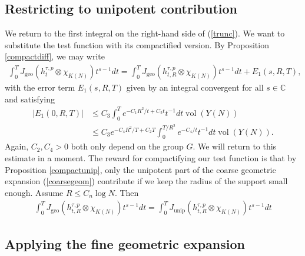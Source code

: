 \documentclass[11pt,reqno]{amsart}
\numberwithin{equation}{section}
\theoremstyle{definition}
\theoremstyle{remark}
\newcommand{\vol}{\operatorname{vol}}
\newcommand{\unip}{\operatorname{unip}}
\newcommand{\geo}{\operatorname{geo}}
\newcommand{\C}{\mathbb{C}}
\begin{document}
\medskip

\subsection*{Restricting to unipotent contribution}

\noindent We return to the first integral on the right-hand side of (\ref{trunc}). We want to substitute the test function with its compactified version. By Proposition \ref{compactdiff}, we may write
\begin{align*}
    \int_0^T J_{\geo}(h^{\tau,p}_t\otimes\chi_{K(N)})t^{s-1}dt = \int_0^T J_{\geo}(h^{\tau,p}_{t,R}\otimes\chi_{K(N)})t^{s-1}dt+E_1(s,R,T),
\end{align*}
with the error term $E_1(s,R,T)$ given by an integral convergent for all $s\in\C$ and satisfying
\begin{align}\label{error1}
    |E_1(0,R,T)| &\leq C_3\int_0^Te^{-C_1R^2/t+C_2t}t^{-1}dt\vol(Y(N)) \\
    &\leq C_3e^{-C_4R^2/T+C_2T}\int_0^{T/R^2}e^{-C_4/t}t^{-1}dt\vol(Y(N)).
\end{align}
Again, $C_2,C_4>0$ both only depend on the group $G$. We will return to this estimate in a moment. The reward for compactifying our test function is that by Proposition \ref{compactunip}, only the unipotent part of the coarse geometric expansion (\ref{coarsegeom}) contribute if we keep the radius of the support small enough. Assume $R\leq C_n\log N$. Then
\begin{align*}
    \int_0^T J_{\geo}(h^{\tau,p}_{t,R}\otimes\chi_{K(N)})t^{s-1}dt = \int_0^T J_{\unip}(h^{\tau,p}_{t,R}\otimes\chi_{K(N)})t^{s-1}dt
\end{align*}

\bigskip

\subsection*{Applying the fine geometric expansion}\label{applyingfine}
\end{document}
